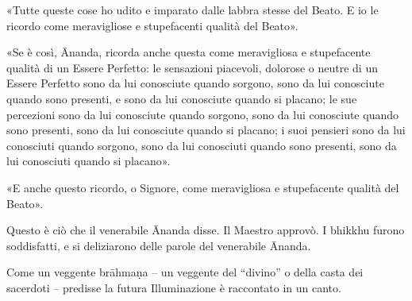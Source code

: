 «Tutte queste cose ho udito e imparato dalle labbra stesse del Beato. E io le
ricordo come meravigliose e stupefacenti qualità del Beato».

«Se è così, Ānanda, ricorda anche questa come meravigliosa e stupefacente
qualità di un Essere Perfetto: le sensazioni piacevoli, dolorose o neutre di un
Essere Perfetto sono da lui conosciute quando sorgono, sono da lui conosciute
quando sono presenti, e sono da lui conosciute quando si placano; le sue
percezioni sono da lui conosciute quando sorgono, sono da lui conosciute quando
sono presenti, sono da lui conosciute quando si placano; i suoi pensieri sono da
lui conosciuti quando sorgono, sono da lui conosciuti quando sono presenti, sono
da lui conosciuti quando si placano».

«E anche questo ricordo, o Signore, come meravigliosa e stupefacente qualità del
Beato».

Questo è ciò che il venerabile Ānanda disse. Il Maestro approvò. I bhikkhu
furono soddisfatti, e si deliziarono delle parole del venerabile Ānanda.


 Come un veggente brāhmaṇa – un veggente del “divino”
o della casta dei sacerdoti – predisse la futura Illuminazione è raccontato in
un canto.


